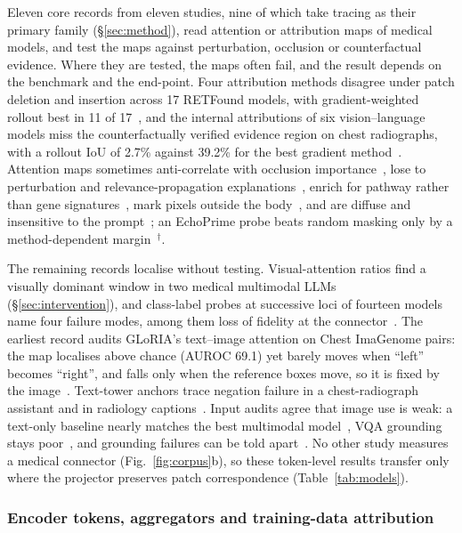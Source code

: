 Eleven core records from eleven studies, nine of which take tracing as their primary family
(\S\ref{sec:method}), read attention or attribution maps of medical models, and \Vtrany{} test the maps
against perturbation, occlusion or counterfactual evidence. Where they are tested, the maps often fail,
and the result depends on the benchmark and the end-point. Four attribution methods disagree under
patch deletion and insertion across 17 RETFound models, with gradient-weighted rollout best in 11 of
17~\cite{bors2026benchmarking}, and the internal attributions of six vision--language models miss the
counterfactually verified evidence region on chest radiographs, with a rollout IoU of 2.7\% against 39.2\%
for the best gradient method~\cite{xiong2026rethinking}. Attention maps sometimes anti-correlate with
occlusion importance~\cite{sadanandan2026attention}, lose to perturbation and relevance-propagation
explanations~\cite{idaji2026beyond}, enrich for pathway rather than gene
signatures~\cite{srikanthan2026do}, mark pixels outside the body~\cite{hashmi2024towards}, and are
diffuse and insensitive to the prompt~\cite{injarabian2025interpreting}; an EchoPrime probe beats random
masking only by a method-dependent margin~\cite{akanova2026interpreting}$^{\dagger}$.

The remaining records localise without testing. Visual-attention ratios find a visually dominant window
in two medical multimodal LLMs~\cite{chen2026vihd} (\S\ref{sec:intervention}), and class-label probes at
successive loci of fourteen models name four failure modes, among them loss of fidelity at the
connector~\cite{zhu2026lost}. The earliest record audits GLoRIA's text--image attention on Chest
ImaGenome pairs: the map localises above chance (AUROC 69.1) yet barely moves when ``left'' becomes
``right'', and falls only when the reference boxes move, so it is fixed by the
image~\cite{mcinerney2022that}. Text-tower anchors trace negation failure in a chest-radiograph assistant
and in radiology captions~\cite{vu2025improving,abbasi2026layerspecific}. Input audits agree that image
use is weak: a text-only baseline nearly matches the best multimodal model~\cite{lotfinia2026vision},
VQA grounding stays poor~\cite{chen2026grounding}, and grounding failures can be told
apart~\cite{liu2026medical}. No other study measures a medical connector (Fig.~\ref{fig:corpus}b), so
these token-level results transfer only where the projector preserves patch correspondence
(Table~\ref{tab:models}).

\subsubsection{Encoder tokens, aggregators and training-data attribution}

